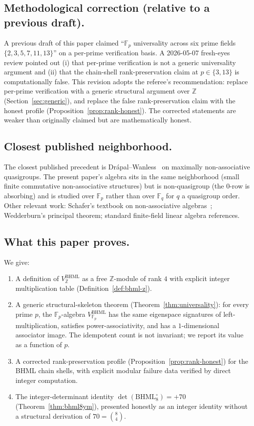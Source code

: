 \documentclass[11pt,reqno]{amsart}
\theoremstyle{plain}
\theoremstyle{definition}
\theoremstyle{remark}
\newcommand{\Z}{\mathbb{Z}}
\newcommand{\F}{\mathbb{F}}
\newcommand{\BHML}{\mathrm{BHML}}
\begin{document}
\subsection{Methodological correction (relative to a previous draft).}
A previous draft of this paper claimed ``$\F_{p}$ universality across
six prime fields $\{2, 3, 5, 7, 11, 13\}$'' on a per-prime
verification basis. A 2026-05-07 fresh-eyes review pointed out (i)
that per-prime verification is not a generic universality argument
and (ii) that the chain-shell rank-preservation claim at $p \in
\{3, 13\}$ is computationally false. This revision adopts the
referee's recommendation: replace per-prime verification with a
generic structural argument over $\Z$ (Section~\ref{sec:generic}),
and replace the false rank-preservation claim with the honest
profile (Proposition~\ref{prop:rank-honest}). The corrected
statements are weaker than originally claimed but are mathematically
honest.

\subsection{Closest published neighborhood.}
The closest published precedent is Drápal--Wanless~\cite{DrapalWanless2021}
on maximally non-associative quasigroups. The present paper's algebra
sits in the same neighborhood (small finite commutative
non-associative structures) but is non-quasigroup (the $0$-row is
absorbing) and is studied over $\F_{p}$ rather than over $\F_{q}$ for
$q$ a quasigroup order. Other relevant work: Schafer's textbook on
non-associative algebras~\cite{Schafer1966}; Wedderburn's principal
theorem; standard finite-field linear algebra references.

\subsection{What this paper proves.}
We give:
\begin{enumerate}
\item A definition of $V^{\BHML}_{\Z}$ as a free $\Z$-module of rank
$4$ with explicit integer multiplication table
(Definition~\ref{def:bhml-z}).
\item A generic structural-skeleton theorem
(Theorem~\ref{thm:universality}): for every prime $p$, the
$\F_{p}$-algebra $V^{\BHML}_{\F_{p}}$ has the same eigenspace
signatures of left-multiplication, satisfies power-associativity,
and has a $1$-dimensional associator image. The idempotent count is
not invariant; we report its value as a function of $p$.
\item A corrected rank-preservation profile
(Proposition~\ref{prop:rank-honest}) for the BHML chain shells, with
explicit modular failure data verified by direct integer computation.
\item The integer-determinant identity
$\det(\BHML_{8}^{\circ}) = +70$
(Theorem~\ref{thm:bhml8ym}), presented honestly as an integer
identity without a structural derivation of $70 = \binom{8}{4}$.
\end{enumerate}
\end{document}
